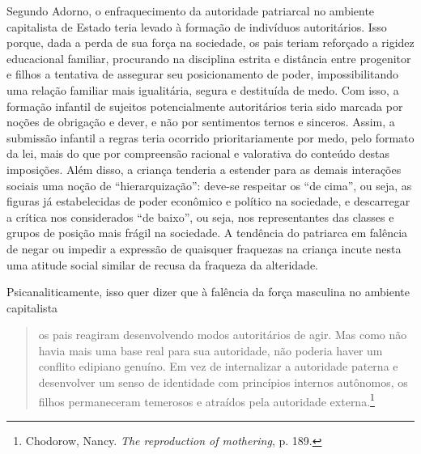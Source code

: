 Segundo Adorno, o enfraquecimento da autoridade patriarcal no ambiente
capitalista de Estado teria levado à formação de indivíduos
autoritários. Isso porque, dada a perda de sua força na sociedade, os
pais teriam reforçado a rigidez educacional familiar, procurando na
disciplina estrita e distância entre progenitor e filhos a tentativa de
assegurar seu posicionamento de poder, impossibilitando uma relação
familiar mais igualitária, segura e destituída de medo. Com isso, a
formação infantil de sujeitos potencialmente autoritários teria sido
marcada por noções de obrigação e dever, e não por sentimentos ternos e
sinceros. Assim, a submissão infantil a regras teria ocorrido
prioritariamente por medo, pelo formato da lei, mais do que por
compreensão racional e valorativa do conteúdo destas imposições. Além
disso, a criança tenderia a estender para as demais interações sociais
uma noção de ``hierarquização'': deve-se respeitar os ``de cima'', ou
seja, as figuras já estabelecidas de poder econômico e político na
sociedade, e descarregar a crítica nos considerados ``de baixo'', ou
seja, nos representantes das classes e grupos de posição mais frágil na
sociedade. A tendência do patriarca em falência de negar ou impedir a
expressão de quaisquer fraquezas na criança incute nesta uma atitude
social similar de recusa da fraqueza da alteridade.

Psicanaliticamente, isso quer dizer que à falência da força masculina no
ambiente capitalista

\begin{quote}
os pais reagiram desenvolvendo modos autoritários de agir. Mas como não
havia mais uma base real para sua autoridade, não poderia haver um
conflito edipiano genuíno. Em vez de internalizar a autoridade paterna e
desenvolver um senso de identidade com princípios internos autônomos, os
filhos permaneceram temerosos e atraídos pela autoridade
externa.\footnote{Chodorow, Nancy.
  \emph{The reproduction of mothering}, p. 189.}
\end{quote}

